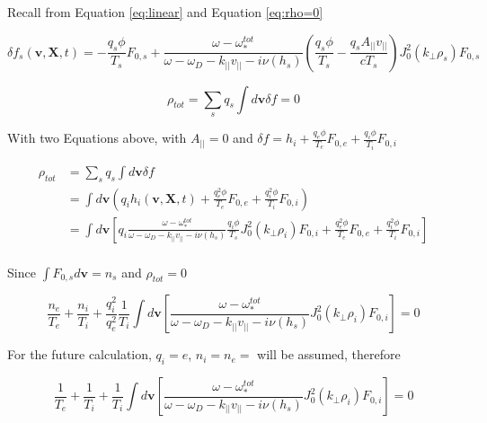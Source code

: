 Recall from Equation \ref{eq:linear} and Equation \ref{eq:rho=0}

\begin{equation}
    \delta f_s(\textbf{v},\textbf{X},t)=-\frac{q_s\phi}{T_s}F_{0,s}+
    \frac{\omega -\omega_*^{tot} 
    }{\omega -\omega_D 
    - k_{||}v_{||}-i\nu(h_s)}\left(\frac{q_s\phi}{T_s}-\frac{q_sA_{||}v_{||}}{cT_s}\right)J_0^2(k_\perp\rho_s)F_{0,s}
\end{equation}

\begin{equation}
\rho_{tot}=\sum_{s} q_s\int d\textbf{v} \delta f=0
\end{equation}

With two Equations above, with $A_{||}=0$ and $\delta f= h_i + \frac{q_e \phi}{T_e} F_{0,e}+ \frac{q_i \phi}{T_i} F_{0,i}$

\begin{equation}
\begin{aligned}
\rho_{tot}{}&=\sum_{s} q_s\int d\textbf{v} \delta f\\
&=\int d\textbf{v} \left(q_ih_i(\textbf{v},\textbf{X},t) + \frac{q_e^2 \phi}{T_e} F_{0,e}+ \frac{q_i^2 \phi}{T_i} F_{0,i}\right)\\
&=\int d\textbf{v} \left[q_i
\frac{\omega -\omega_*^{tot} 
    }{\omega -\omega_D 
    - k_{||}v_{||}-i\nu(h_s)}\frac{q_i\phi}{T_s}J_0^2(k_\perp\rho_i)F_{0,i}
+ \frac{q_e^2 \phi}{T_e} F_{0,e}+ \frac{q_i^2 \phi}{T_i} F_{0,i}\right]\\
\end{aligned}
\end{equation}

Since $\int F_{0,s}d\textbf{v}=n_s$ and $\rho_{tot}=0$

\begin{equation}
   \frac{n_e}{T_e} + \frac{n_i }{T_i}+\frac{q_i^2}{q_e^2} \frac{1}{T_i} \int d\textbf{v} \left[
\frac{\omega -\omega_*^{tot} 
    }{\omega -\omega_D 
    - k_{||}v_{||}-i\nu(h_s)}J_0^2(k_\perp\rho_i)F_{0,i}
 \right]=0
\label{eq:ITG}
\end{equation}

For the future calculation, $q_i=e$, $n_i=n_e= $ will be assumed, therefore 

\begin{equation}
   \frac{1}{T_e} + \frac{1}{T_i}+\frac{1}{T_i} \int d\textbf{v} \left[
\frac{\omega -\omega_*^{tot} 
    }{\omega -\omega_D 
    - k_{||}v_{||}-i\nu(h_s)}J_0^2(k_\perp\rho_i)F_{0,i}
 \right]=0
\end{equation}

